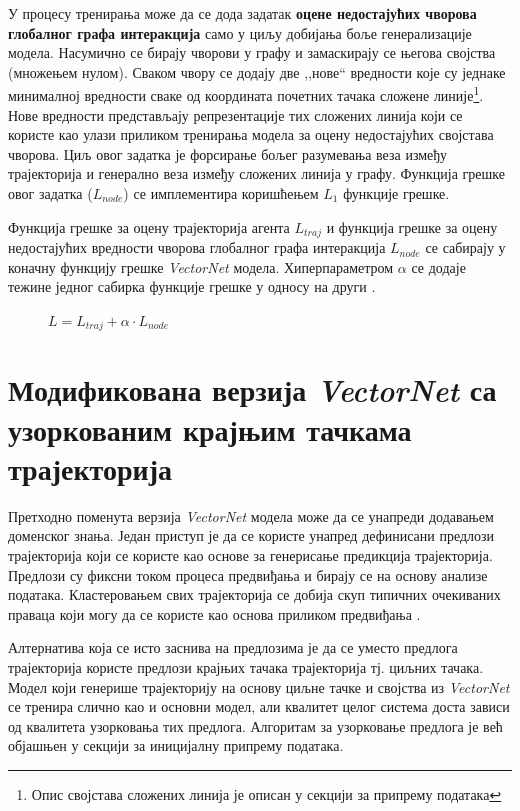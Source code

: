 \documentclass[11pt,oneside]{memoir}
\begin{document}
У процесу тренирања може да се дода задатак \textbf{оцене недостајућих чворова глобалног графа интеракција} само у циљу
добијања боље генерализације модела. Насумично се бирају чворови у графу и замаскирају
се његова својства (множењем нулом).
Сваком чвору се додају две ,,нове`` вредности које су једнаке минималној вредности сваке од координата почетних
тачака сложене линије\footnote{Опис својстава сложених линија је описан у секцији за припрему података}. Нове вредности представљају репрезентације тих сложених линија који се користе као улази приликом тренирања модела за оцену недостајућих својстава чворова. Циљ овог задатка је форсирање бољег разумевања
веза између трајекторија и генерално веза између сложених линија у графу. Функција грешке овог задатка ($L_{node}$) се имплементира коришћењем $L_1$
функције грешке.

Функција грешке за оцену трајекторија агента $L_{traj}$ и функција грешке за оцену
недостајућих вредности чворова глобалног графа интеракција $L_{node}$ се сабирају у коначну функцију грешке \textit{VectorNet} модела.
Хиперпараметром $\alpha$ се додаје тежине једног сабирка функције грешке у односу на други \cite{vectornet}.

\begin{figure}[H]
  \centering
  $L = L_{traj} + \alpha \cdot L_{node}$
\end{figure}

\section{Модификована верзија \textit{VectorNet} са узоркованим крајњим тачкама трајекторија}

Претходно поменута верзија \textit{VectorNet} модела може да се унапреди додавањем доменског знања. Један приступ је да се користе унапред
дефинисани предлози трајекторија који се користе као основе за генерисање предикција трајекторија. Предлози су фиксни током процеса
предвиђања и бирају се на основу анализе података. Кластеровањем свих трајекторија се добија скуп типичних очекиваних праваца
који могу да се користе као основа приликом предвиђања \cite{multipath}.

Алтернатива која се исто заснива на предлозима је да се уместо предлога трајекторија користе предлози крајњих тачака трајекторија
тј. циљних тачака. Модел који генерише трајекторију на основу циљне тачке и својства из \textit{VectorNet} се тренира слично као и основни модел, 
али квалитет целог система доста зависи од квалитета узорковања тих предлога. Алгоритам за узорковање предлога је већ објашњен у секцији за
иницијалну припрему података.
\end{document}
